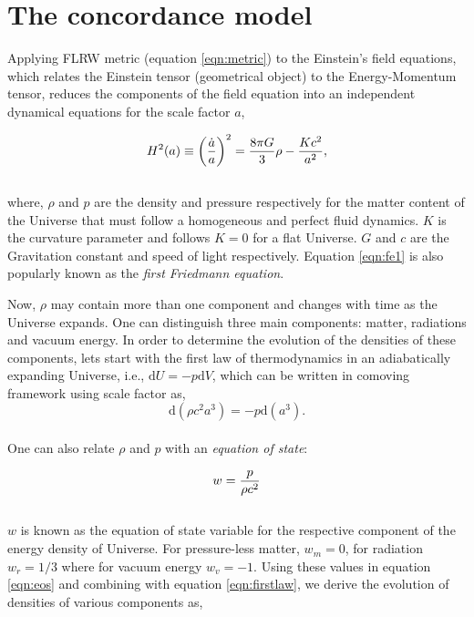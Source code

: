 \section{The concordance model}


Applying FLRW metric (equation \ref{eqn:metric}) to the Einstein's field equations, 
which relates the Einstein tensor (geometrical object) to the Energy-Momentum tensor, 
reduces the components of the field equation into an independent dynamical equations
for the scale factor $a$,

\begin{equation}
\centering
H^2(a) \equiv \left( \dfrac{\dot{a}}{a} \right)^2 = 
			\dfrac{8 \pi G}{3} \rho - \dfrac{Kc^2}{a^2},
\label{eqn:fe1}
\end{equation}
\\
where, $\rho$ and $p$ are the density and pressure respectively for the matter content
of the Universe that must follow a homogeneous and perfect fluid dynamics. 
$K$ is the curvature parameter and follows $K=0$ for a flat Universe. $G$ and $c$ are
the Gravitation constant and speed of light respectively. Equation \ref{eqn:fe1} is 
also popularly known as the {\it first Friedmann equation}.

Now, $\rho$ may contain more than one component and changes with time as the Universe 
expands. One can distinguish three main components: matter, radiations and vacuum 
energy. In order to determine the evolution of the densities of these components,
lets start with the first law of thermodynamics in an adiabatically expanding Universe,
i.e., $\mathrm{d}U = -p\mathrm{d}V$, which can be written in comoving framework
using scale factor as,
\begin{equation}
	\mathrm{d}(\rho c^2 a^3) = -p \mathrm{d} (a^3).
	\label{eqn:firstlaw}
\end{equation}
\\
One can also relate $\rho$ and $p$ with an {\it equation of state}:

\begin{equation}
\centering
w = \dfrac{p}{\rho c^2}
\label{eqn:eos}
\end{equation}
\\
$w$ is known as the equation of state variable for the respective component
of the energy density of Universe. For pressure-less matter, $w_m=0$,
for radiation $w_r=1/3$ where for vacuum energy $w_v=-1$. Using these values 
in equation \ref{eqn:eos} and combining with equation \ref{eqn:firstlaw}, we 
derive the evolution of densities of various components as,


